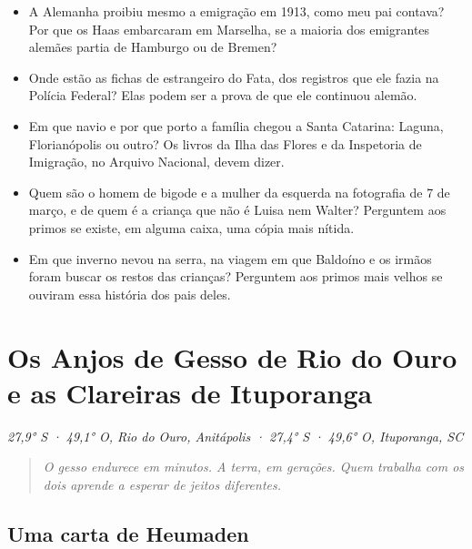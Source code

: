\documentclass[
  brazilian,
  11pt,
  openany]{book}
\providecommand{\tightlist}{%
  \setlength{\itemsep}{0pt}\setlength{\parskip}{0pt}}
\begin{document}
\begin{itemize}
\tightlist
\item
  A Alemanha proibiu mesmo a emigração em 1913, como meu pai contava?
  Por que os Haas embarcaram em Marselha, se a maioria dos emigrantes
  alemães partia de Hamburgo ou de Bremen?
\item
  Onde estão as fichas de estrangeiro do Fata, dos registros que ele
  fazia na Polícia Federal? Elas podem ser a prova de que ele continuou
  alemão.
\item
  Em que navio e por que porto a família chegou a Santa Catarina:
  Laguna, Florianópolis ou outro? Os livros da Ilha das Flores e da
  Inspetoria de Imigração, no Arquivo Nacional, devem dizer.
\item
  Quem são o homem de bigode e a mulher da esquerda na fotografia de 7
  de março, e de quem é a criança que não é Luisa nem Walter? Perguntem
  aos primos se existe, em alguma caixa, uma cópia mais nítida.
\item
  Em que inverno nevou na serra, na viagem em que Baldoíno e os irmãos
  foram buscar os restos das crianças? Perguntem aos primos mais velhos
  se ouviram essa história dos pais deles.
\end{itemize}

\chapter{Os Anjos de Gesso de Rio do Ouro e as Clareiras de
Ituporanga}\label{cap-6}

\emph{27,9° S · 49,1° O, Rio do Ouro, Anitápolis · 27,4° S · 49,6° O,
Ituporanga, SC}

\begin{quote}
\emph{O gesso endurece em minutos. A terra, em gerações. Quem trabalha
com os dois aprende a esperar de jeitos diferentes.}
\end{quote}

\section{Uma carta de Heumaden}\label{uma-carta-de-heumaden}
\end{document}
